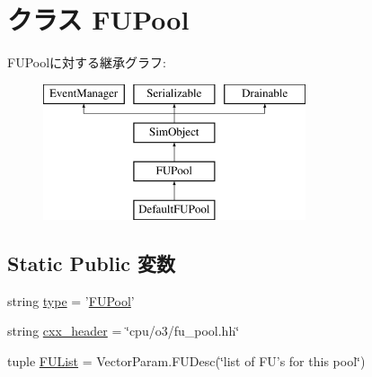 \hypertarget{classFUPool_1_1FUPool}{
\section{クラス FUPool}
\label{classFUPool_1_1FUPool}
}
FUPoolに対する継承グラフ:\begin{figure}[H]
\begin{center}
\leavevmode
\includegraphics[height=4cm]{classFUPool_1_1FUPool}
\end{center}
\end{figure}
\subsection*{Static Public 変数}
\begin{DoxyCompactItemize}
\item 
string \hyperlink{classFUPool_1_1FUPool_acce15679d830831b0bbe8ebc2a60b2ca}{type} = '\hyperlink{classFUPool_1_1FUPool}{FUPool}'
\item 
string \hyperlink{classFUPool_1_1FUPool_a17da7064bc5c518791f0c891eff05fda}{cxx\_\-header} = \char`\"{}cpu/o3/fu\_\-pool.hh\char`\"{}
\item 
tuple \hyperlink{classFUPool_1_1FUPool_a82873a213d944933f9899d3ad30cb8cd}{FUList} = VectorParam.FUDesc(\char`\"{}list of FU's for this pool\char`\"{})
\end{DoxyCompactItemize}


